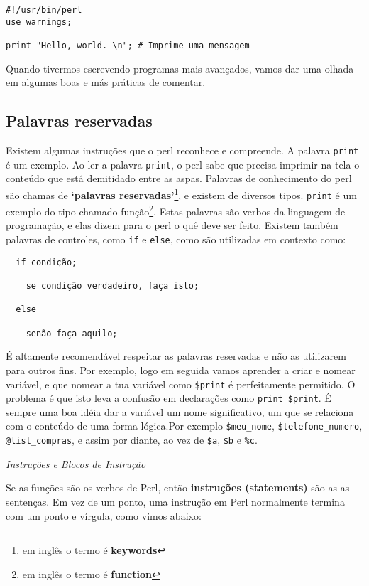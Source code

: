 \documentclass[a4paper,12pt,twoside]{book}
\begin{document}
\begin{lstlisting}
#!/usr/bin/perl
use warnings;

print "Hello, world. \n"; # Imprime uma mensagem
\end{lstlisting}

\noindent Quando tivermos escrevendo programas mais avançados, vamos 
dar uma olhada em algumas boas e más práticas de comentar.\medskip

\subsection{Palavras reservadas}

\noindent Existem algumas instruções que o perl reconhece e compreende.
A palavra \texttt{print} é um exemplo. Ao ler a palavra \texttt{print}, 
o perl sabe que precisa imprimir na tela o conteúdo que está demitidado 
entre as aspas. Palavras de conhecimento do perl são chamas de 
\textbf{`palavras reservadas'}\footnote{em inglês o termo é \textbf{keywords}}, 
e existem de diversos tipos. \texttt{print} é um exemplo do tipo chamado 
função\footnote{em inglês o termo é \textbf{function}}. Estas palavras 
são verbos da linguagem de programação, e elas dizem para o perl o quê 
deve ser feito. Existem também palavras de controles, como \texttt{if} 
e \texttt{else}, como são utilizadas em contexto como:\medskip

{\scriptsize
\begin{verbatim}
  if condição;

    se condição verdadeiro, faça isto;

  else

    senão faça aquilo;
\end{verbatim}
}

\noindent É altamente recomendável respeitar as palavras reservadas 
e não as utilizarem para outros fins. Por exemplo, logo em seguida vamos 
aprender a criar e nomear variável, e que nomear a tua variável como 
\texttt{\$print} é perfeitamente permitido. O problema é que isto leva 
a confusão em declarações como \texttt{print \$print}. É sempre uma boa 
idéia dar a variável um nome significativo, um que se relaciona com o 
conteúdo de uma forma lógica.Por exemplo \texttt{\$meu\_nome}, \texttt{\$telefone\_numero}, 
\texttt{@list\_compras}, e assim por diante, ao vez de \texttt{\$a}, \texttt{\$b} 
e \texttt{\%c}.\medskip

\noindent \textit{Instruções e Blocos de Instrução}

\noindent Se as funções são os verbos de Perl, então \textbf{instruções (statements) } são as 
as sentenças. Em vez de um ponto, uma instrução em Perl normalmente termina
com um ponto e vírgula, como vimos abaixo:\medskip
\end{document}
